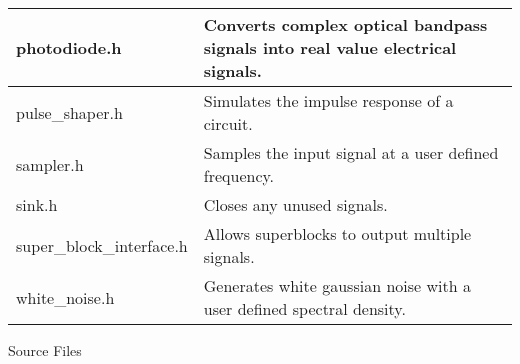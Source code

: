 \begin{table}[H]
\begin{tabulary}{1.0\textwidth}{|p{6cm}|L|}
photodiode.h               & Converts complex optical bandpass signals into real value electrical signals. \\ \hline
pulse\_shaper.h            & Simulates the impulse response of a circuit.          \\ \hline
sampler.h                  & Samples the input signal at a user defined frequency. \\ \hline
sink.h                     & Closes any unused signals.                           \\ \hline
super\_block\_interface.h  & Allows superblocks to output multiple signals.       \\ \hline
white\_noise.h             & Generates white gaussian noise with a user defined spectral density.\\ \hline
\end{tabulary}
\end{table}		
%
Source Files
